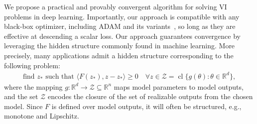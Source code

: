 \documentclass{article} %
\theoremstyle{definition}
\newcommand{\reals}{\mathbb{R}}
\newcommand*\closure[1]{\operatorname{cl}#1}
\newcommand{\inner}[2]{\langle #1, #2 \rangle}
\begin{document}
We propose a practical and provably convergent algorithm for solving VI problems in deep learning.
Importantly, our approach is compatible with any black-box optimizer, including ADAM and its variants~\citep{kingma2014adam}, so long as they are effective at descending a scalar loss.
Our approach guarantees convergence by leveraging the hidden structure commonly found in machine learning.
More precisely, many applications admit a hidden structure corresponding to the following problem: 
\begin{align}\label{eq:vi}
\text{find }z_\ast \text{ such that }
    \inner{F(z_\ast)}{z-z_\ast} \geq 0 \quad \forall z \in \mathcal{Z} = \closure{\{g(\theta) : \theta \in \reals^d\}},
\end{align}
where the mapping $g: \reals^d \to \mathcal{Z} \subseteq \reals^n$ maps model parameters to model outputs, and the set $\mathcal{Z}$ encodes the closure of the set of realizable outputs from the chosen model.
Since $F$ is defined over model outputs, it will often be structured, e.g., monotone and Lipschitz.

\end{document}
